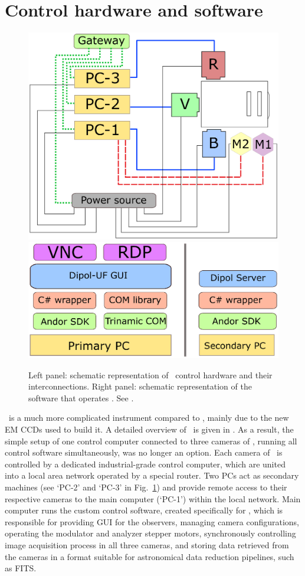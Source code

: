 \section{Control hardware and software}
\begin{figure}
    \includegraphics[keepaspectratio, width = 0.49\linewidth]{images/hardware.eps}
    \includegraphics[keepaspectratio, width = 0.49\linewidth]{images/software.eps}
    \caption{
        Left panel: schematic representation of \DUF\ control hardware and their interconnections.
        Right panel: schematic representation of the software that operates \DUF.
        See \paperI.}
    \label{fig:dipol-uf-components}

\end{figure}
\DUF\ is a much more complicated instrument compared to \DP, mainly due to the new \gls{EM} \glspl{CCD} used to build it.
A detailed overview of \DUF\ is given in \paperI.
As a result, the simple setup of one control computer connected to three cameras of \DP, running all control software simultaneously, was no longer an option.
Each camera of \DUF\ is controlled by a dedicated industrial-grade control computer, which are united into a local area network operated by a special router.
Two \glspl{PC} act as secondary machines (see `\gls{PC}-2' and `\gls{PC}-3' in Fig.~\ref{fig:dipol-uf-components}) and provide remote access to their respective cameras to the main computer (`\gls{PC}-1') within the local network.
Main computer runs the custom control software, created specifically for \DUF, which is responsible for providing \gls{GUI} for the observers, managing camera configurations, operating the modulator and analyzer stepper motors, synchronously controlling image acquisition process in all three cameras, and storing data retrieved from the cameras in a format suitable for astronomical data reduction pipelines, such as \gls{FITS}.

